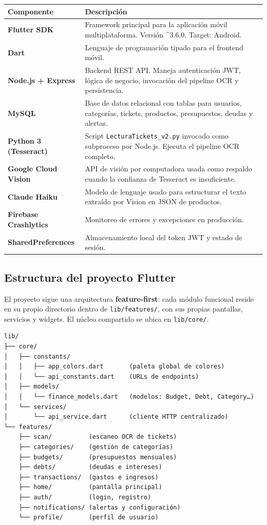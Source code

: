 \documentclass[12pt, letterpaper]{article}
\newcommand{\archivo}[1]{\texttt{\small\color{gristexto}#1}}
\begin{document}
\begin{longtable}{>{\bfseries\small}p{3.5cm} p{9.5cm}}
  \toprule
  Componente & Descripción \\
  \midrule
  \endhead
  Flutter SDK & Framework principal para la aplicación móvil multiplataforma.
    Versión \textasciicircum 3.6.0. Target: Android. \\[4pt]
  Dart & Lenguaje de programación tipado para el frontend móvil. \\[4pt]
  Node.js + Express & Backend REST API. Maneja autenticación JWT, lógica de
    negocio, invocación del pipeline OCR y persistencia. \\[4pt]
  MySQL & Base de datos relacional con tablas para usuarios, categorías,
    tickets, productos, presupuestos, deudas y alertas. \\[4pt]
  Python 3 (Tesseract) & Script \archivo{LecturaTickets\_v2.py} invocado
    como subproceso por Node.js. Ejecuta el pipeline OCR completo. \\[4pt]
  Google Cloud Vision & API de visión por computadora usada como respaldo
    cuando la confianza de Tesseract es insuficiente. \\[4pt]
  Claude Haiku & Modelo de lenguaje usado para estructurar el texto extraído
    por Vision en JSON de productos. \\[4pt]
  Firebase Crashlytics & Monitoreo de errores y excepciones en producción. \\[4pt]
  SharedPreferences & Almacenamiento local del token JWT y estado de sesión. \\
  \bottomrule
\end{longtable}

\subsection{Estructura del proyecto Flutter}

El proyecto sigue una arquitectura \textbf{feature-first}: cada módulo
funcional reside en su propio directorio dentro de \archivo{lib/features/},
con sus propias pantallas, servicios y widgets. El núcleo compartido se
ubica en \archivo{lib/core/}.

\begin{lstlisting}[language={}, numbers=none, frame=none, backgroundcolor=\color{white}]
lib/
├── core/
│   ├── constants/
│   │   ├── app_colors.dart       (paleta global de colores)
│   │   └── api_constants.dart    (URLs de endpoints)
│   ├── models/
│   │   └── finance_models.dart   (modelos: Budget, Debt, Category…)
│   └── services/
│       └── api_service.dart      (cliente HTTP centralizado)
└── features/
    ├── scan/          (escaneo OCR de tickets)
    ├── categories/    (gestión de categorías)
    ├── budgets/       (presupuestos mensuales)
    ├── debts/         (deudas e intereses)
    ├── transactions/  (gastos e ingresos)
    ├── home/          (pantalla principal)
    ├── auth/          (login, registro)
    ├── notifications/ (alertas y configuración)
    └── profile/       (perfil de usuario)
\end{lstlisting}
\end{document}
